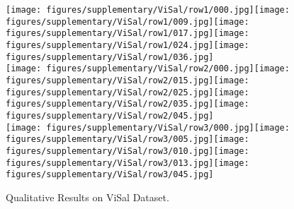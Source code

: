 \documentclass{bmvc2k_arxiv}
\begin{document}
 \begin{figure}[h]
\centering
\texttt{[image: figures/supplementary/ViSal/row1/000.jpg]}\hspace{1px}\texttt{[image: figures/supplementary/ViSal/row1/009.jpg]}\hspace{1px}\texttt{[image: figures/supplementary/ViSal/row1/017.jpg]}\hspace{1px}\texttt{[image: figures/supplementary/ViSal/row1/024.jpg]}\hspace{1px}\texttt{[image: figures/supplementary/ViSal/row1/036.jpg]}\\
\texttt{[image: figures/supplementary/ViSal/row2/000.jpg]}\hspace{1px}\texttt{[image: figures/supplementary/ViSal/row2/015.jpg]}\hspace{1px}\texttt{[image: figures/supplementary/ViSal/row2/025.jpg]}\hspace{1px}\texttt{[image: figures/supplementary/ViSal/row2/035.jpg]}\hspace{1px}\texttt{[image: figures/supplementary/ViSal/row2/045.jpg]}\\
\texttt{[image: figures/supplementary/ViSal/row3/000.jpg]}\hspace{1px}\texttt{[image: figures/supplementary/ViSal/row3/005.jpg]}\hspace{1px}\texttt{[image: figures/supplementary/ViSal/row3/010.jpg]}\hspace{1px}\texttt{[image: figures/supplementary/ViSal/row3/013.jpg]}\hspace{1px}\texttt{[image: figures/supplementary/ViSal/row3/045.jpg]}\\
  
\vspace{-2px}
  \caption{Qualitative Results on ViSal Dataset.}
  \label{fig:teaser}
\end{figure} 
\end{document}
